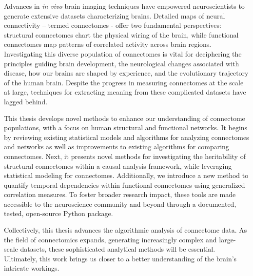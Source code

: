 
Advances in \textit{in vivo} brain imaging techniques have empowered neuroscientists to generate extensive datasets characterizing brains. Detailed maps of neural connectivity – termed connectomes - offer two fundamental perspectives: structural connectomes chart the physical wiring of the brain, while functional connectomes map patterns of correlated activity across brain regions. Investigating this diverse population of connectomes is vital for deciphering the principles guiding brain development, the neurological changes associated with disease, how our brains are shaped by experience, and the evolutionary trajectory of the human brain. Despite the progress in measuring connectomes at the scale at large, techniques for extracting meaning from these complicated datasets have lagged behind.

This thesis develops novel methods to enhance our understanding of connectome populations, with a focus on human structural and functional networks.  It begins by reviewing existing statistical models and algorithms for analyzing connectomes and networks as well as improvements to existing algorithms for comparing connectomes. Next, it presents novel methods for investigating the heritability of structural connectomes within a causal analysis framework, while leveraging statistical modeling for connectomes. Additionally, we introduce a new method to quantify temporal dependencies within functional connectomes using generalized correlation measures. To foster broader research impact, these tools are made accessible to the neuroscience community and beyond through a documented, tested, open-source Python package.

Collectively, this thesis advances the algorithmic analysis of connectome data. As the field of connectomics expands, generating increasingly complex and large-scale datasets, these sophisticated analytical methods will be essential. Ultimately, this work brings us closer to a better understanding of the brain's intricate workings.


